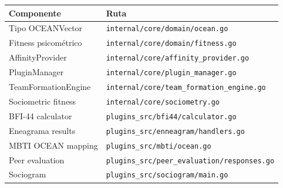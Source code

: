 \documentclass[12pt,a4paper]{article}
\begin{document}
\begin{table}[h]
\centering
\small
\begin{tabular}{ll}
\toprule
\textbf{Componente} & \textbf{Ruta} \\
\midrule
Tipo OCEANVector & \texttt{internal/core/domain/ocean.go} \\
Fitness psicométrico & \texttt{internal/core/domain/fitness.go} \\
AffinityProvider & \texttt{internal/core/affinity\_provider.go} \\
PluginManager & \texttt{internal/core/plugin\_manager.go} \\
TeamFormationEngine & \texttt{internal/core/team\_formation\_engine.go} \\
Sociometric fitness & \texttt{internal/core/sociometry.go} \\
BFI-44 calculator & \texttt{plugins\_src/bfi44/calculator.go} \\
Eneagrama results & \texttt{plugins\_src/enneagram/handlers.go} \\
MBTI OCEAN mapping & \texttt{plugins\_src/mbti/ocean.go} \\
Peer evaluation & \texttt{plugins\_src/peer\_evaluation/responses.go} \\
Sociogram & \texttt{plugins\_src/sociogram/main.go} \\
\bottomrule
\end{tabular}
\end{table}
\end{document}
